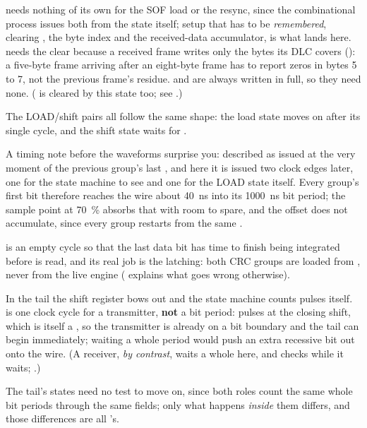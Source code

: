  needs nothing of its own for the SOF load or the resync, since the combinational
process issues both from the state itself; setup that has to be \emph{remembered}, clearing
, the byte index and the received-data accumulator, is what lands here. 
needs the clear because a received frame writes only the bytes its DLC covers (): a
five-byte frame arriving after an eight-byte frame has to report zeros in bytes 5 to 7, not the
previous frame's residue.  and  are always written in full, so they
need none. ( is cleared by this state too; see .)

The LOAD/shift pairs all follow the same shape: the load state moves on after its single cycle, and
the shift state waits for .

\begin{aside}
A timing note before the waveforms surprise you:  described  as issued at
the very moment of the previous group's last , and here it is issued two clock edges
later, one for the state machine to see  and one for the LOAD state itself. Every
group's first bit therefore reaches the wire about 40~ns into its 1000~ns bit period; the sample
point at 70~\% absorbs that with room to spare, and the offset does not accumulate, since every group
restarts from the same .
\end{aside}

 is an empty cycle so that the last data bit has time to finish being integrated
before  is read, and its real job is the latching: both CRC groups are loaded from
, never from the live engine ( explains what goes wrong
otherwise).

In the tail the shift register bows out and the state machine counts  pulses
itself.  is one clock cycle for a transmitter, \textbf{not} a bit period:
 pulses at the closing shift, which is itself a , so the
transmitter is already on a bit boundary and the tail can begin immediately; waiting a whole period
would push an extra recessive bit out onto the wire. (A receiver, \emph{by contrast}, waits a whole
 here, and checks  while it waits; .)

The tail's states need no  test to move on, since both roles count the same whole bit
periods through the same fields; only what happens \emph{inside} them differs, and those differences
are all 's.

